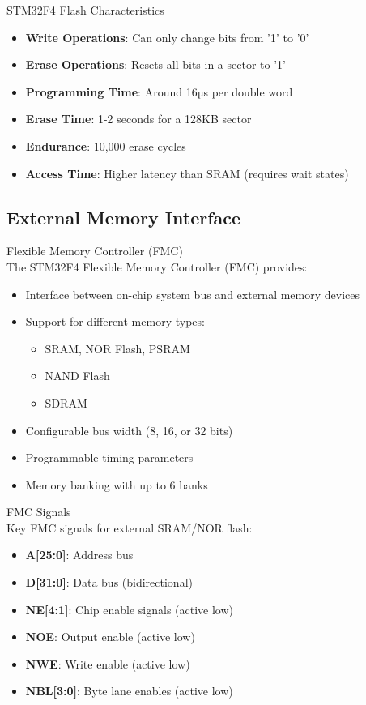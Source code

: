 \begin{definition}{STM32F4 Flash Characteristics}
\begin{itemize}
    \item \textbf{Write Operations}: Can only change bits from '1' to '0'
    \item \textbf{Erase Operations}: Resets all bits in a sector to '1'
    \item \textbf{Programming Time}: Around 16µs per double word
    \item \textbf{Erase Time}: 1-2 seconds for a 128KB sector
    \item \textbf{Endurance}: 10,000 erase cycles
    \item \textbf{Access Time}: Higher latency than SRAM (requires wait states)
\end{itemize}
\end{definition}

\subsection{External Memory Interface}

\begin{concept}{Flexible Memory Controller (FMC)}\\
The STM32F4 Flexible Memory Controller (FMC) provides:
\begin{itemize}
    \item Interface between on-chip system bus and external memory devices
    \item Support for different memory types:
    \begin{itemize}
        \item SRAM, NOR Flash, PSRAM
        \item NAND Flash
        \item SDRAM
    \end{itemize}
    \item Configurable bus width (8, 16, or 32 bits)
    \item Programmable timing parameters
    \item Memory banking with up to 6 banks
\end{itemize}
\end{concept}

\begin{definition}{FMC Signals}\\
Key FMC signals for external SRAM/NOR flash:
\begin{itemize}
    \item \textbf{A[25:0]}: Address bus
    \item \textbf{D[31:0]}: Data bus (bidirectional)
    \item \textbf{NE[4:1]}: Chip enable signals (active low)
    \item \textbf{NOE}: Output enable (active low)
    \item \textbf{NWE}: Write enable (active low)
    \item \textbf{NBL[3:0]}: Byte lane enables (active low)
\end{itemize}
\end{definition}

